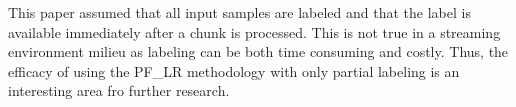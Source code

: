 \documentclass[conference]{IEEEtran}
\begin{document}
This paper assumed that all input samples are labeled and that the label is available immediately after a chunk is processed. This is not true in a streaming environment milieu as labeling can be both time consuming and costly. Thus, the efficacy of using the PF\_LR methodology with only partial labeling is an interesting area fro further research. 




%
%
%
\end{document}
